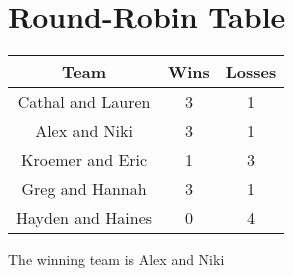 \documentclass[11pt]{article}
\begin{document}
\vspace*{-.3in}
\section{Round-Robin Table}
\label{sec:relatedwork}
\vspace*{-.1in}



  \begin{center}
    \begin{tabular}{|c|c|c|}
		\hline 
        \textbf{Team} & \textbf{Wins} & \textbf{Losses} \\
        \hline 
        Cathal and Lauren & 3 & 1 \\
        Alex and Niki & 3 & 1 \\
	     Kroemer and Eric & 1 & 3 \\
        Greg and Hannah & 3 & 1 \\
        Hayden and Haines & 0 & 4 \\
        \hline
    \end{tabular}
  \end{center}


 \begin{center}
   The winning team is Alex and Niki
 \end{center}
\end{document}
